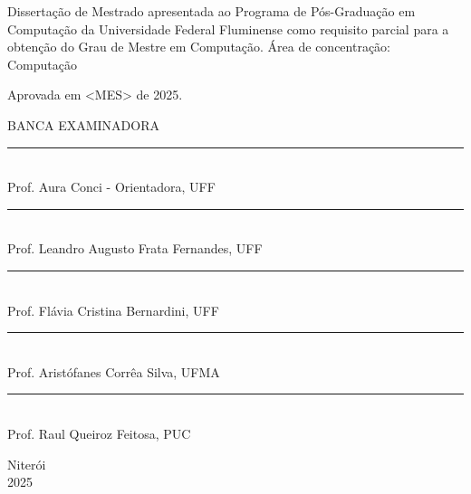\noindent
\begin{flushright}
\begin{minipage}[t]{8cm}

Dissertação de Mestrado apresentada ao Programa de P\'{o}s-Gradua\c{c}\~{a}o em Computa\c{c}\~{a}o da Universidade Federal Fluminense como requisito parcial para a obten\c{c}\~{a}o do \mbox{Grau} de Mestre em Computa\c{c}\~{a}o. \'{A}rea de concentra\c{c}\~{a}o: \mbox{Computa\c{c}\~{a}o} %

\end{minipage}
\end{flushright}
\vspace{1.0 cm}
\noindent
Aprovada em <MES> de 2025. \\
\begin{flushright}
  {
  \begin{center}
  BANCA EXAMINADORA \\
  \vspace{6mm}
  \rule{11cm}{.1mm} \\
    Prof. Aura Conci - Orientadora, UFF \\
    \vspace{6mm}
  \rule{11cm}{.1mm} \\
    Prof. Leandro Augusto Frata Fernandes, UFF\\
    \vspace{6mm}
  \rule{11cm}{.1mm} \\
    Prof. Flávia Cristina Bernardini, UFF\\
  \vspace{4mm}
  \rule{11cm}{.1mm} \\
    Prof. Aristófanes Corrêa Silva, UFMA\\
    \vspace{6mm}
  \rule{11cm}{.1mm} \\
    Prof. Raul Queiroz Feitosa, PUC\\
  \vspace{6mm}
  \end{center}
  }
\end{flushright}
\begin{center}
  \vspace{4mm}
  Niter\'{o}i \\
  2025

\end{center}

\cleardoublepage
\thispagestyle{empty}
\vspace*{200mm}

